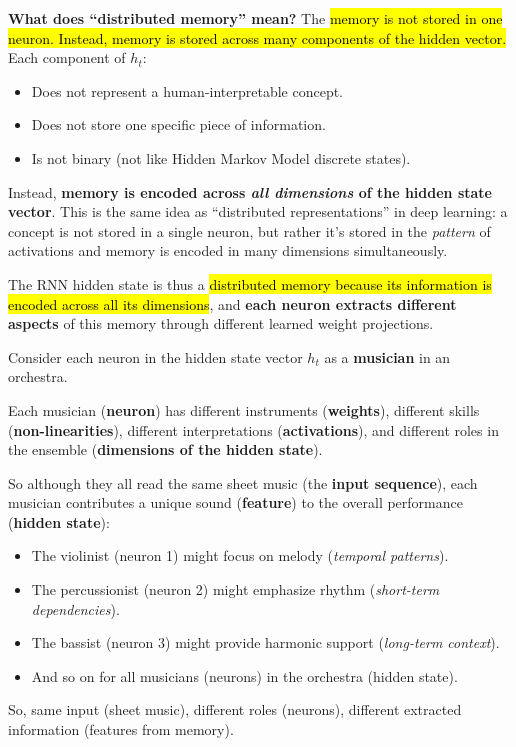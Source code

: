 \highspace
\textcolor{Green3}{ \textbf{What does ``distributed memory'' mean?}} The \hl{memory is not stored in one neuron. Instead, memory is stored across many components of the hidden vector.} Each component of $h_t$:
\begin{itemize}
    \item[\textcolor{Red2}{\faIcon{times}}] Does not represent a human-interpretable concept.
    \item[\textcolor{Red2}{\faIcon{times}}] Does not store one specific piece of information.
    \item[\textcolor{Red2}{\faIcon{times}}] Is not binary (not like Hidden Markov Model discrete states).
\end{itemize}
Instead, \textbf{memory is encoded across \emph{all dimensions} of the hidden state vector}. This is the same idea as ``distributed representations'' in deep learning: a concept is not stored in a single neuron, but rather it's stored in the \emph{pattern} of activations and memory is encoded in many dimensions simultaneously.

\highspace
The RNN hidden state is thus a \hl{distributed memory because its information is encoded across all its dimensions}, and \textbf{each neuron extracts different aspects} of this memory through different learned weight projections.

\begin{examplebox}
    Consider each neuron in the hidden state vector $h_t$ as a \textbf{musician} in an orchestra.

    \highspace
    Each musician (\textbf{neuron}) has different instruments (\textbf{weights}), different skills (\textbf{non-linearities}), different interpretations (\textbf{activations}), and different roles in the ensemble (\textbf{dimensions of the hidden state}).

    \highspace
    So although they all read the same sheet music (the \textbf{input sequence}), each musician contributes a unique sound (\textbf{feature}) to the overall performance (\textbf{hidden state}):
    \begin{itemize}
        \item The violinist (neuron 1) might focus on melody (\emph{temporal patterns}).
        \item The percussionist (neuron 2) might emphasize rhythm (\emph{short-term dependencies}).
        \item The bassist (neuron 3) might provide harmonic support (\emph{long-term context}).
        \item And so on for all musicians (neurons) in the orchestra (hidden state).
    \end{itemize}
    So, same input (sheet music), different roles (neurons), different extracted information (features from memory).
\end{examplebox}

